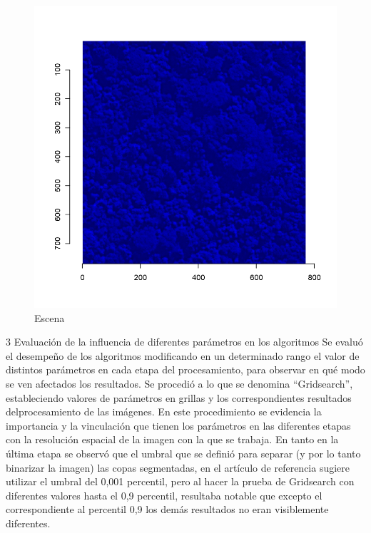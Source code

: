 \begin{figure}
    \includegraphics[width=\textwidth]{Imagenes/Resultados script morfologico/output_18_0.png}
     \hfill
     \caption{Escena }
    \label{etapa1}
\end{figure}
3 Evaluación de la influencia de diferentes parámetros en los 
algoritmos
Se evaluó el desempeño de los algoritmos modificando en un determinado rango el
valor de distintos parámetros en cada etapa del procesamiento, para observar en qué
modo se ven afectados los resultados. Se procedió a lo que se denomina “Gridsearch”,
estableciendo valores de parámetros en grillas y los correspondientes resultados delprocesamiento de las imágenes. En este procedimiento se evidencia la importancia y la
vinculación que tienen los parámetros en las diferentes etapas con la resolución espacial
de la imagen con la que se trabaja. En tanto en la última etapa se observó que el umbral
que se definió para separar (y por lo tanto binarizar la imagen) las copas segmentadas,
en el artículo de referencia sugiere utilizar el umbral del 0,001 percentil, pero al hacer la
prueba de Gridsearch con diferentes valores hasta el 0,9 percentil, resultaba notable que
excepto el correspondiente al percentil 0,9 los demás resultados no eran visiblemente
diferentes.

